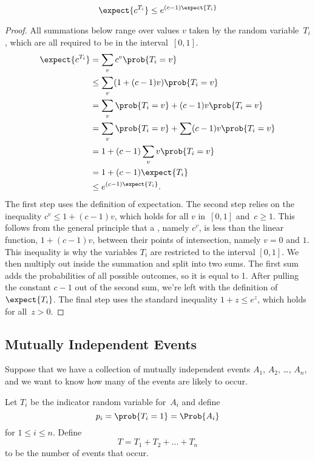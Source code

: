 \begin{lemma}
\label{chernoff-lemma2}
\[
    \expect{c^{T_i}} \leq e^{(c - 1) \expect{T_i}}
\]
\end{lemma}

\begin{proof}
All summations below range over values $v$ taken by the random
variable~$T_i$, which are all required to be in the interval~$[0, 1]$.
\begin{align*}
\expect{c^{T_i}} & = \sum_v c^v \prob{T_i = v} \\
           & \leq \sum_v (1 + (c-1) v) \prob{T_i = v} \\
           & = \sum_v \prob{T_i = v} + (c-1) v \prob{T_i = v} \\
           & = \sum_v \prob{T_i = v} + \sum(c-1) v \prob{T_i = v} \\
           & = 1 + (c - 1) \sum_v v \prob{T_i = v} \\
           & = 1 + (c - 1) \expect{T_i} \\
           & \leq e^{(c - 1) \expect{T_i}}.
\end{align*}
The first step uses the definition of expectation.  The second step
relies on the inequality $c^v \leq 1 + (c-1) v$, which holds for all
$v$ in~$[0,1]$ and~$c \geq 1$.  This follows from the general
principle that a , namely $c^v$, is less than the
linear function, $1 + (c-1) v$, between their points of intersection,
namely $v = 0$ and $1$.  This inequality is why the variables $T_i$
are restricted to the interval $[0, 1]$.  We then multiply out inside
the summation and split into two sums.  The first sum adds the
probabilities of all possible outcomes, so it is equal to 1.  After
pulling the constant $c - 1$ out of the second sum, we're left with
the definition of $\expect{T_i}$.  The final step uses the standard
inequality $1 + z \leq e^z$, which holds for all~$z > 0$.
\end{proof}

\subsection{Mutually Independent Events}

Suppose that we have a collection of mutually independent events $A_1$,
$A_2$, \dots, $A_n$, and we want to know how many of the events are
likely to occur.

Let $T_i$ be the indicator random variable for~$A_i$ and define
\begin{equation*}
    p_i = \prob{T_i = 1} = \Prob{A_i}
\end{equation*}
for $1 \le i \le n$.  Define
\begin{equation*}
    T = T_1 + T_2 + \dots + T_n
\end{equation*}
to be the number of events that occur.

